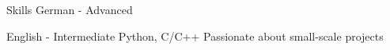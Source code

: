 
\begin{rubric}{Skills}
\entry*[Languages]
	German - Advanced

    English - Intermediate
    Python, C/C++
\entry*[Misc.]
	Passionate about small-scale projects
\end{rubric}
